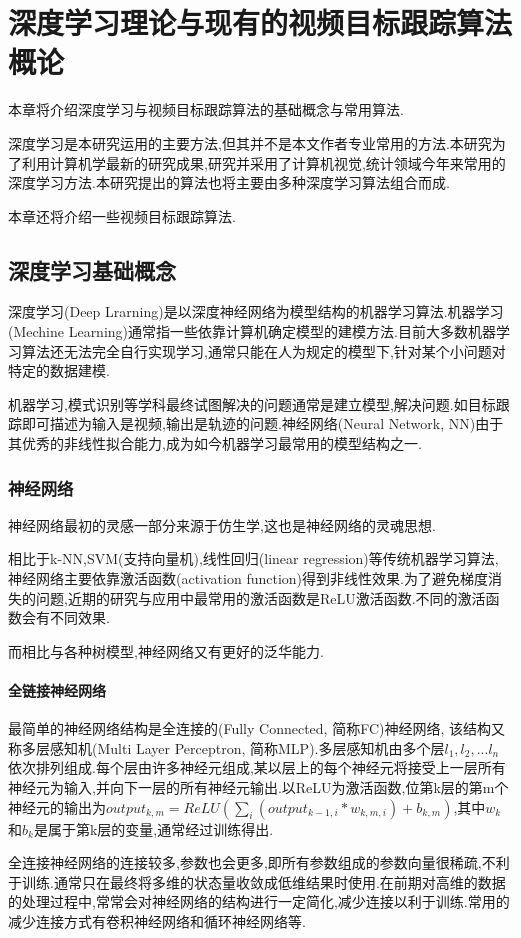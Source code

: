 
\chapter{深度学习理论与现有的视频目标跟踪算法概论}
本章将介绍深度学习与视频目标跟踪算法的基础概念与常用算法.
\par
深度学习是本研究运用的主要方法,但其并不是本文作者专业常用的方法.本研究为了利用计算机学最新的研究成果,研究并采用了计算机视觉,统计领域今年来常用的深度学习方法.本研究提出的算法也将主要由多种深度学习算法组合而成.
\par
本章还将介绍一些视频目标跟踪算法.

\section{深度学习基础概念}
深度学习(Deep Lrarning)是以深度神经网络为模型结构的机器学习算法\supercite{deng2014deep}.机器学习(Mechine Learning)通常指一些依靠计算机确定模型的建模方法.目前大多数机器学习算法还无法完全自行实现学习,通常只能在人为规定的模型下,针对某个小问题对特定的数据建模.
\par
机器学习,模式识别等学科最终试图解决的问题通常是建立模型,解决问题.如目标跟踪即可描述为输入是视频,输出是轨迹的问题.神经网络(Neural Network, NN)由于其优秀的非线性拟合能力,成为如今机器学习最常用的模型结构之一.
\subsection{神经网络}
神经网络最初的灵感一部分来源于仿生学\supercite{mcculloch1943logical}\supercite{farley1954simulation},这也是神经网络的灵魂思想.
\par
相比于k-NN,SVM(支持向量机),线性回归(linear regression)等传统机器学习算法,神经网络主要依靠激活函数(activation function)得到非线性效果.为了避免梯度消失的问题,近期的研究与应用中最常用的激活函数是ReLU激活函数\supercite{krizhevsky2012imagenet}.不同的激活函数会有不同效果\supercite{karlik2011performance}.
\par
而相比与各种树模型,神经网络又有更好的泛华能力.
\par
\subsubsection{全链接神经网络}
\par
最简单的神经网络结构是全连接的(Fully Connected, 简称FC)神经网络, 该结构又称多层感知机(Multi Layer Perceptron, 简称MLP).多层感知机由多个层$l_1,l_2,...l_n$依次排列组成.每个层由许多神经元组成,某以层上的每个神经元将接受上一层所有神经元为输入,并向下一层的所有神经元输出.以ReLU为激活函数,位第k层的第m个神经元的输出为$output_{k,m}=ReLU(\sum_{i} (output_{k-1,i}*w_{k,m,i})+b_{k,m})$,其中$w_{k}$和$b_{k}$是属于第k层的变量,通常经过训练得出.
\par
全连接神经网络的连接较多,参数也会更多,即所有参数组成的参数向量很稀疏,不利于训练.通常只在最终将多维的状态量收敛成低维结果时使用.在前期对高维的数据的处理过程中,常常会对神经网络的结构进行一定简化,减少连接以利于训练.常用的减少连接方式有卷积神经网络和循环神经网络等.
\par
